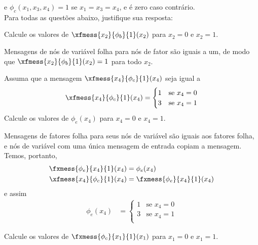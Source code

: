 e $\phi_c(x_1,x_3,x_4) = 1$ se $x_1=x_3=x_4$, e \'e zero caso contr\'ario.\\[2ex]
Para todas as quest\~oes abaixo, justifique sua resposta:
\begin{exenumerate}
    \item Calcule os valores de $\xfmess{x_2}{\phi_b}{1}(x_2)$ para $x_2=0$ e $x_2=1$.
    
    \begin{solution}
        Mensagens de n\'os de vari\'avel folha para n\'os de fator s\~ao iguais a um, de modo que $\xfmess{x_2}{\phi_b}{1}(x_2)=1$ para todo $x_2$.
    \end{solution}
    
    \item Assuma que a mensagem $\xfmess{x_4}{\phi_c}{1}(x_4)$ seja igual a
    $$\xfmess{x_4}{\phi_c}{1}(x_4) = \begin{cases}
        1 & \text{se } x_4=0\\
        3 & \text{se } x_4=1\\
    \end{cases}$$
    Calcule os valores de $\phi_e(x_4)$ para $x_4=0$ e $x_4=1$. 
    
    \begin{solution}
        
        Mensagens de fatores folha para seus n\'os de vari\'avel s\~ao
        iguais aos fatores folha, e n\'os de vari\'avel com uma \'unica
        mensagem de entrada copiam a mensagem. Temos, portanto,
        \begin{align}
            \fxmess{\phi_e}{x_4}{1}(x_4) & = \phi_e(x_4)\\
            \xfmess{x_4}{\phi_c}{1}(x_4) & =  \fxmess{\phi_e}{x_4}{1}(x_4)
        \end{align}
        e assim
        \begin{align}
            \phi_e(x_4) &= \begin{cases}
                1 & \text{se } x_4=0\\
                3 & \text{se } x_4=1\\
            \end{cases}
        \end{align}
        
    \end{solution}
    
    
    \item Calcule os valores de $\fxmess{\phi_c}{x_1}{1}(x_1)$ para $x_1=0$ e $x_1=1$.
    

\end{exenumerate}
